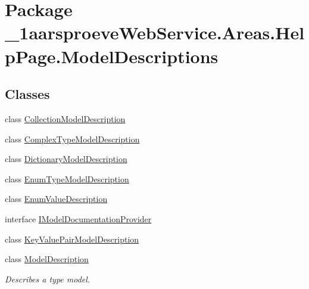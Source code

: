\hypertarget{namespace__1aarsproeve_web_service_1_1_areas_1_1_help_page_1_1_model_descriptions}{}\section{Package \+\_\+1aarsproeve\+Web\+Service.\+Areas.\+Help\+Page.\+Model\+Descriptions}
\label{namespace__1aarsproeve_web_service_1_1_areas_1_1_help_page_1_1_model_descriptions}
\subsection*{Classes}
\begin{DoxyCompactItemize}
\item 
class \hyperlink{class__1aarsproeve_web_service_1_1_areas_1_1_help_page_1_1_model_descriptions_1_1_collection_model_description}{Collection\+Model\+Description}
\item 
class \hyperlink{class__1aarsproeve_web_service_1_1_areas_1_1_help_page_1_1_model_descriptions_1_1_complex_type_model_description}{Complex\+Type\+Model\+Description}
\item 
class \hyperlink{class__1aarsproeve_web_service_1_1_areas_1_1_help_page_1_1_model_descriptions_1_1_dictionary_model_description}{Dictionary\+Model\+Description}
\item 
class \hyperlink{class__1aarsproeve_web_service_1_1_areas_1_1_help_page_1_1_model_descriptions_1_1_enum_type_model_description}{Enum\+Type\+Model\+Description}
\item 
class \hyperlink{class__1aarsproeve_web_service_1_1_areas_1_1_help_page_1_1_model_descriptions_1_1_enum_value_description}{Enum\+Value\+Description}
\item 
interface \hyperlink{interface__1aarsproeve_web_service_1_1_areas_1_1_help_page_1_1_model_descriptions_1_1_i_model_documentation_provider}{I\+Model\+Documentation\+Provider}
\item 
class \hyperlink{class__1aarsproeve_web_service_1_1_areas_1_1_help_page_1_1_model_descriptions_1_1_key_value_pair_model_description}{Key\+Value\+Pair\+Model\+Description}
\item 
class \hyperlink{class__1aarsproeve_web_service_1_1_areas_1_1_help_page_1_1_model_descriptions_1_1_model_description}{Model\+Description}
\begin{DoxyCompactList}\small\item\em Describes a type model. \end{DoxyCompactList}\item 

\end{DoxyCompactItemize}
